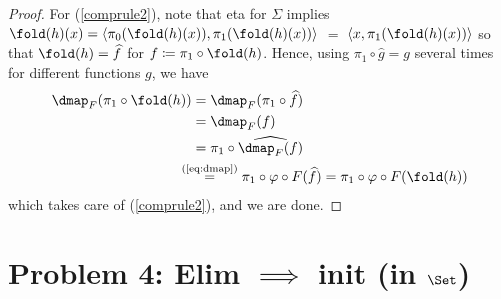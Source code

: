 \documentclass{article}
\begin{document}
\begin{proof}
For (\ref{comprule2}), note that eta for $\Sigma$ implies $\fold(h)(x)
= \langle \pi_0(\fold(h)(x)), \pi_1(\fold(h)(x))\rangle$ $=$ $\langle
x, \pi_1(\fold(h)(x))\rangle$ so that $\fold(h) = \widehat{f}$ for $f
\coloneqq \pi_1 \circ \fold(h)$. Hence, using $\pi_1 \circ \widehat{g}
= g$ several times for different functions $g$, we have
\begin{align*}
  \dmap_F(\pi_1 \circ \fold(h)) &=  \dmap_F(\pi_1 \circ \widehat{f}) \\
  &= \dmap_F(f) \\
  &= \pi_1 \circ \widehat{\dmap_F(f)} \\
  &\!\!\!\!\!\!\stackrel{\text{(\ref{eq:dmap})}}{=} \pi_1 \circ \varphi \circ F(\widehat{f}) = \pi_1 \circ \varphi \circ F(\fold(h))
\end{align*}
which takes care of (\ref{comprule2}), and we are done.
\end{proof}



\section*{Problem 4: Elim $\implies$ init (in $\Set$)}
\end{document}
